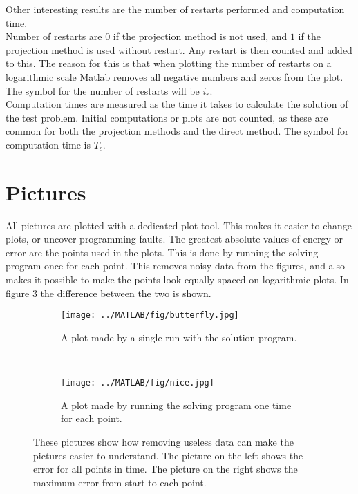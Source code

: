 Other interesting results are the number of restarts performed and computation time. \\
Number of restarts are $0$ if the projection method is not used, and $1$ if the projection method is used without restart. Any restart is then counted and added to this. The reason for this is that when plotting the number of restarts on a logarithmic scale Matlab removes all negative numbers and zeros from the plot. The symbol for the number of restarts will be $i_r$.\\
Computation times are measured as the time  it takes to calculate the solution of the test problem. Initial computations or plots are not counted, as these are common for both the projection methods and the direct method.
The symbol for computation time is $T_c$.  \\

\section{Pictures}%
All pictures are plotted with a dedicated plot tool. This makes it easier to change plots, or uncover programming faults. The greatest absolute values of energy or error are the points used in the plots. This is done by running the solving program once for each point. This removes noisy data from the figures, and also makes it possible to make the points look equally spaced on logarithmic plots. In figure \ref{fig:pic} the difference between the two is shown. \\
\begin{figure}[H]
        \centering
        \begin{subfigure}[b]{0.45\textwidth}
                \texttt{[image: ../MATLAB/fig/butterfly.jpg]}
                \caption{ A plot made by a single run with the solution program. }
                \label{fig:butterfly}
        \end{subfigure}
        ~
        \begin{subfigure}[b]{0.45\textwidth}
                \texttt{[image: ../MATLAB/fig/nice.jpg]}
                \caption{ A plot made by running the solving program one time for each point. }
                \label{fig:nice}
        \end{subfigure}
        \caption{ These pictures show how removing useless data can make the pictures easier to understand. The picture on the left shows the error for all points in time. The picture on the right shows the maximum error from start to each point. }
        \label{fig:pic}
\end{figure}


